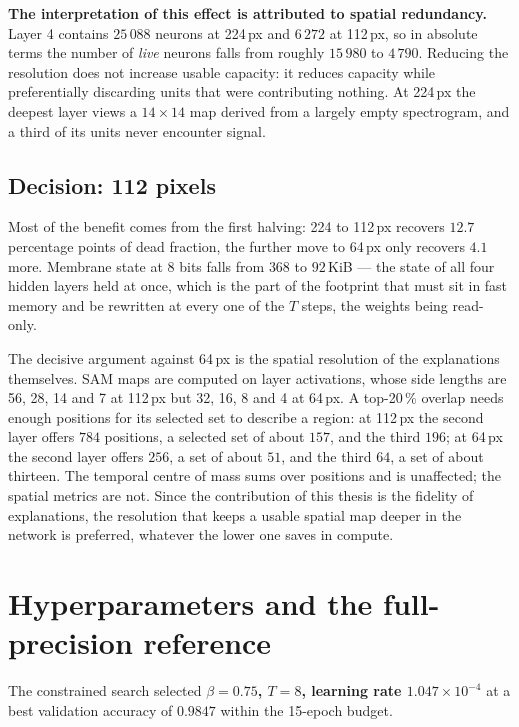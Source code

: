 \textbf{The interpretation of this effect is attributed to spatial redundancy.} 
Layer 4
contains $25\,088$ neurons at 224\,px and $6\,272$ at 112\,px, so in absolute
terms the number of \emph{live} neurons falls from roughly $15\,980$ to $4\,790$.
Reducing the resolution does not increase usable capacity: it reduces capacity
while preferentially discarding units that were contributing nothing. At 224\,px
the deepest layer views a $14 \times 14$ map derived from a largely empty
spectrogram, and a third of its units never encounter signal.

\subsection{Decision: 112 pixels}

Most of the benefit comes from the first halving: 224 to 112\,px recovers $12.7$
percentage points of dead fraction, the further move to 64\,px only recovers $4.1$ more.
Membrane state at 8 bits falls from $368$ to $92$\,KiB --- the state of all four
hidden layers held at once, which is the part of the footprint that must sit in
fast memory and be rewritten at every one of the $T$ steps, the weights being
read-only.

The decisive argument against 64\,px is the spatial resolution of the
explanations themselves. SAM maps are computed on layer activations, whose side
lengths are 56, 28, 14 and 7 at 112\,px but 32, 16, 8 and 4 at 64\,px. A
top-20\,\% overlap needs enough positions for its selected set to describe a
region: at 112\,px the second layer offers $784$ positions, a selected set of
about $157$, and the third $196$; at 64\,px the second layer offers $256$, a set
of about $51$, and the third $64$, a set of about thirteen. The temporal centre of mass sums
over positions and is unaffected; the spatial metrics are not. Since the
contribution of this thesis is the fidelity of explanations, the resolution that
keeps a usable spatial map deeper in the network is preferred, whatever the
lower one saves in compute.

\section{Hyperparameters and the full-precision reference}
\label{sec:hyperparameters}

The constrained search selected \textbf{$\beta = 0.75$, $T = 8$, learning rate
$1.047 \times 10^{-4}$} at a best validation accuracy of $0.9847$ within the
15-epoch budget.

